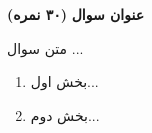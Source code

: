 \Large \textbf{عنوان سوال}
\large \textbf{(۳۰ نمره)}

\normalsize \vspace{0.5cm}
متن سوال ...
\begin{enumerate}[label=(\alph*)]
	\item
	بخش اول...
	\item 
	بخش دوم...
\end{enumerate}


